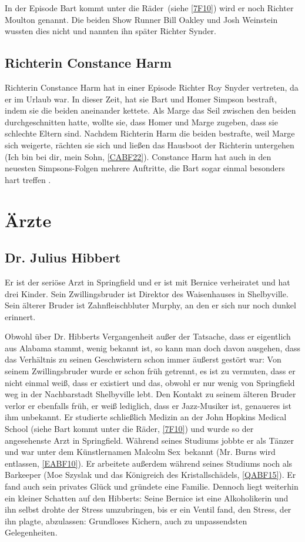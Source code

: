 In der Episode \glqq Bart kommt unter die Räder\grqq\ (siehe \ref{7F10}) wird er noch Richter Moulton genannt. Die beiden Show Runner Bill Oakley und Josh Weinstein wussten dies nicht und nannten ihn später Richter Synder.


\subsection{Richterin Constance Harm}
Richterin Constance Harm hat in einer Episode Richter Roy Snyder vertreten, da er im Urlaub war. In dieser Zeit, hat sie Bart und Homer Simpson bestraft, indem sie die beiden aneinander kettete. Als Marge das Seil zwischen den beiden durchgeschnitten hatte, wollte sie, dass Homer und Marge zugeben, dass sie schlechte Eltern sind. Nachdem Richterin Harm die beiden bestrafte, weil Marge sich weigerte, rächten sie sich und ließen das Hausboot der Richterin untergehen (\glqq Ich bin bei dir, mein Sohn\grqq , \ref{CABF22}). Constance Harm hat auch in den neuesten Simpsons-Folgen mehrere Auftritte, die Bart sogar einmal besonders hart treffen \cite{Wikipedia}.

\section{Ärzte}
\subsection{Dr. Julius Hibbert}\label{JuliusHibbert}
Er ist der seriöse Arzt in Springfield und er ist mit Bernice verheiratet und hat drei Kinder. Sein Zwillingsbruder ist Direktor des Waisenhauses in Shelbyville. Sein älterer Bruder ist Zahnfleischbluter Murphy, an den er sich nur noch dunkel erinnert.

Obwohl über Dr. Hibberts Vergangenheit außer der Tatsache, dass er eigentlich aus Alabama stammt, wenig bekannt ist, so kann man doch davon ausgehen, dass das Verhältnis zu seinen Geschwistern schon immer äußerst gestört war: Von seinem Zwillingsbruder wurde er schon früh getrennt, es ist zu vermuten, dass er nicht einmal weiß, dass er existiert und das, obwohl er nur wenig von Springfield weg in der Nachbarstadt Shelbyville lebt. Den Kontakt zu seinem älteren Bruder verlor er ebenfalls früh, er weiß lediglich, dass er Jazz-Musiker ist, genaueres ist ihm unbekannt. Er studierte schließlich Medizin an der John Hopkins Medical School (siehe \glqq Bart kommt unter die Räder\grqq, \ref{7F10}) und wurde so der angesehenste Arzt in Springfield. Während seines Studiums jobbte er als Tänzer und war unter dem Künstlernamen \glqq Malcolm Sex\grqq\ bekannt (\glqq Mr. Burns wird entlassen\grqq , \ref{EABF10}). Er arbeitete außerdem während seines Studiums noch als Barkeeper (\glqq Moe Szyslak und das Königreich des Kristallschädels\grqq, \ref{QABF15}). Er fand auch sein privates Glück und gründete eine Familie. Dennoch liegt weiterhin ein kleiner Schatten auf den Hibberts: Seine Bernice ist eine Alkoholikerin und ihn selbst drohte der Stress umzubringen, bis er ein Ventil fand, den Stress, der ihn plagte, abzulassen: Grundloses Kichern, auch zu unpassendsten Gelegenheiten.

